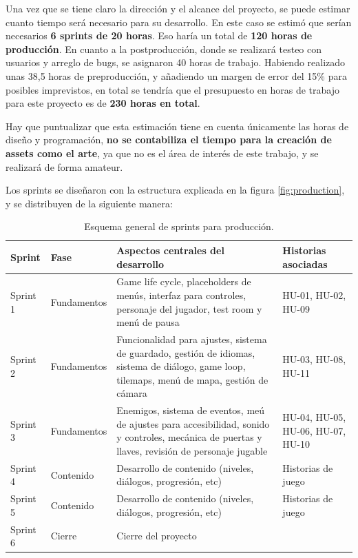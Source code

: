 Una vez que se tiene claro la dirección y el alcance del proyecto, se puede estimar cuanto tiempo será necesario para su desarrollo. En este caso se estimó que serían necesarios \textbf{6 sprints de 20 horas}. Eso haría un total de \textbf{120 horas de producción}. En cuanto a la postproducción, donde se realizará testeo con usuarios y arreglo de bugs, se asignaron 40 horas de trabajo. Habiendo realizado unas 38,5 horas de preproducción, y añadiendo un margen de error del 15\% para posibles imprevistos, en total se tendría que el presupuesto en horas de trabajo para este proyecto es de \textbf{230 horas en total}.

Hay que puntualizar que esta estimación tiene en cuenta únicamente las horas de diseño y programación, \textbf{no se contabiliza el tiempo para la creación de assets como el arte}, ya que no es el área de interés de este trabajo, y se realizará de forma amateur.

Los sprints se diseñaron con la estructura explicada en la figura \ref{fig:production}, y se distribuyen de la siguiente manera:

\begin{table}[H]
    \centering
    \begin{tabular}{|l|l|p{8cm}|p{}|}
    \hline
        Sprint & Fase & Aspectos centrales del desarrollo & Historias asociadas \\ \hline
        Sprint 1 & Fundamentos & Game life cycle, placeholders de menús, interfaz para controles, personaje del jugador, test room y menú de pausa & HU-01, HU-02, HU-09 \\ \hline
        Sprint 2 & Fundamentos & Funcionalidad para ajustes, sistema de guardado, gestión de idiomas, sistema de diálogo, game loop, tilemaps, menú de mapa, gestión de cámara & HU-03, HU-08, HU-11 \\ \hline
        Sprint 3 & Fundamentos & Enemigos, sistema de eventos, meú de ajustes para accesibilidad, sonido y controles, mecánica de puertas y llaves, revisión de personaje jugable & HU-04, HU-05, HU-06, HU-07, HU-10 \\ \hline
        Sprint 4 & Contenido & Desarrollo de contenido (niveles, diálogos, progresión, etc) & Historias de juego \\ \hline
        Sprint 5 & Contenido & Desarrollo de contenido (niveles, diálogos, progresión, etc) & Historias de juego \\ \hline
        Sprint 6 & Cierre & Cierre del proyecto & ~ \\ \hline
    \end{tabular}
    \caption{Esquema general de sprints para producción.}
\end{table}

